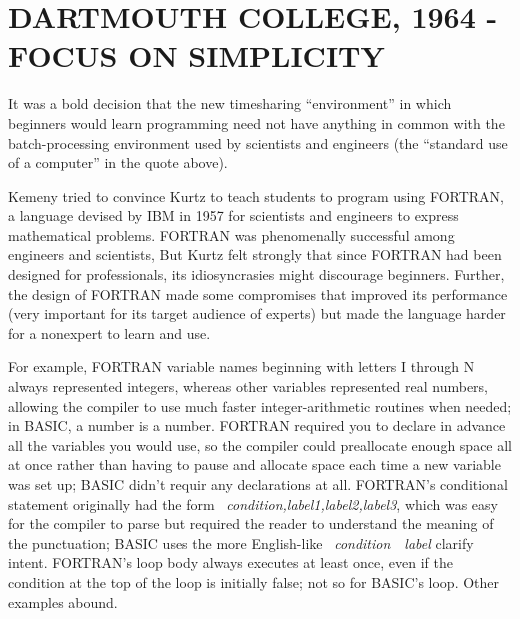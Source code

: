 
\section{DARTMOUTH COLLEGE, 1964 - FOCUS ON SIMPLICITY}



It was a bold decision that the new timesharing
``environment'' in which beginners would learn programming need not have
anything in common with the batch-processing environment used by
scientists and engineers (the ``standard use of a computer'' in the
quote above). 

Kemeny tried to convince Kurtz to teach students to program using FORTRAN, 
a language devised by IBM in 1957 for scientists and
engineers to express mathematical problems.  
FORTRAN was phenomenally successful among engineers and scientists,
But Kurtz felt strongly that since FORTRAN had
been designed for professionals,
its idiosyncrasies might discourage beginners.  Further, the design of
FORTRAN made some 
compromises that improved its performance (very important for its target
audience of experts) but made the language harder
for a nonexpert to learn and use.

\begin{geeknote}{}
For example, FORTRAN variable names beginning with letters I
through N always represented integers, whereas other variables represented
real numbers, allowing the compiler to use much faster
integer-arithmetic routines when needed; in BASIC, a number is a number.  
FORTRAN required you to
declare in advance all the variables you would use, so the compiler
could preallocate enough space all at once rather than having to pause
and allocate space each time a new variable was set up; BASIC didn't
requir any declarations at all.
FORTRAN's
conditional statement originally had the form 
~\emph{condition,label1,label2,label3}, which was easy for the
compiler to parse but required the reader to
understand the meaning of the punctuation; BASIC uses the more
English-like ~\emph{condition}~~\emph{label}
clarify intent.  FORTRAN's  loop body always executes at least once,
even if the condition at the top of the loop is initially false; not
so for BASIC's  loop.
Other examples abound.
\end{geeknote}


